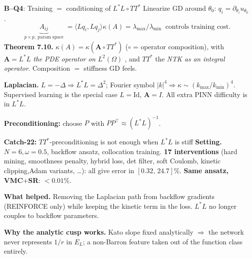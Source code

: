\documentclass[10pt,aspectratio=169]{beamer}
\newcommand{\paperB}[1]{\textcolor{papB}{\textbf{#1}}}
\newcommand{\ours}[1]{\textcolor{ourwork}{\textbf{#1}}}
\begin{document}
\begin{frame}{\paperB{B--Q4}: Training $=$ conditioning of $L^\ast L \circ TT^\ast$}
\small
Linearize GD around $\theta_0$: $q_i=\partial_{\theta_i}u_{\theta_0}$.
\[
  \underbrace{A_{ij}}_{\substack{p\times p,\ \text{param space}}} = \langle Lq_i,Lq_j\rangle
  \kappa(A)=\lambda_{\max}/\lambda_{\min}\ \text{ controls training cost.}
\]
\textbf{Theorem 7.10.} $\kappa(A) = \kappa(\mathbf A\circ TT^\ast)$
($\circ$ = operator composition), with $\mathbf A=L^\ast L$ \emph{the PDE operator on $L^2(\Omega)$}
, and $TT^\ast$ the \emph{NTK as an integral operator}. Composition
$=$ stiffness GD feels.

\vspace{4pt}
\textbf{Laplacian.} $L=-\Delta \Rightarrow L^\ast L=\Delta^2$; Fourier symbol $|k|^4 \Rightarrow
\kappa\sim(k_{\max}/k_{\min})^4$.
Supervised learning is the special case $L{=}\mathrm{Id}$, $\mathbf A{=}I$. All extra PINN
difficulty is in $L^\ast L$.

\vspace{4pt}
\textbf{Preconditioning:} choose $P$ with $PP^\top \approx (L^\ast L)^{-1}$.
\end{frame}

\begin{frame}{\ours{Catch-22:} $TT^\ast$-preconditioning is not enough when $L^\ast L$ is stiff}
\small
\textbf{Setting.} $N{=}6,\omega{=}0.5$, backflow ansatz, collocation training.
\textbf{17 interventions} (hard mining, smoothness penalty, hybrid loss, det filter, soft
Coulomb, kinetic clipping,Adam variants, \ldots): all give error in $[0.32,\,24.7]\%$.
\textbf{Same ansatz, VMC$+$SR}: $<0.01\%$.

\vspace{4pt}
\textbf{What helped.} Removing the Laplacian path from backflow gradients (REINFORCE only) while
keeping the kinetic term in the loss. $L^\ast L$ no longer couples to backflow parameters.

\vspace{2pt}
\textbf{Why the analytic cusp works.} Kato slope fixed analytically $\Rightarrow$ the network never
represents $1/r$ in $E_L$; a non-Barron feature taken out of the function class entirely.
\end{frame}

\end{document}
